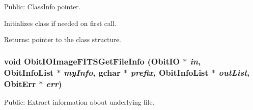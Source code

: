 Public: Class\-Info pointer. 

Initializes class if needed on first call. \begin{Desc}
\item[Returns:]pointer to the class structure. \end{Desc}
\subsubsection{\setlength{\rightskip}{0pt plus 5cm}void Obit\-IOImage\-FITSGet\-File\-Info ({\bf Obit\-IO} $\ast$ {\em in}, {\bf Obit\-Info\-List} $\ast$ {\em my\-Info}, gchar $\ast$ {\em prefix}, {\bf Obit\-Info\-List} $\ast$ {\em out\-List}, {\bf Obit\-Err} $\ast$ {\em err})}\label{ObitIOImageFITS_8h_a23}


Public: Extract information about underlying file. 

